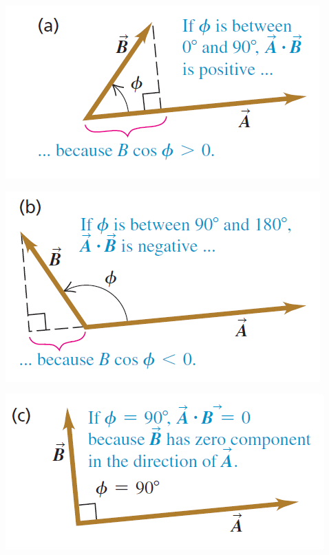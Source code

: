 \documentclass[12pt, a4paper, reqno]{amsart}
\theoremstyle{definition}
\numberwithin{equation}{section} %
\begin{document}
\begin{minipage}{.3\textwidth}
	\centering
	\includegraphics[width=1\linewidth]{4.png}
\end{minipage}%
\begin{minipage}{.3\textwidth}
	\centering
	\includegraphics[width=1\linewidth]{5.png}
\end{minipage}
\begin{minipage}{.3\textwidth}
	\centering
	\includegraphics[width=1\linewidth]{6.png}
\end{minipage}%
\end{document}
